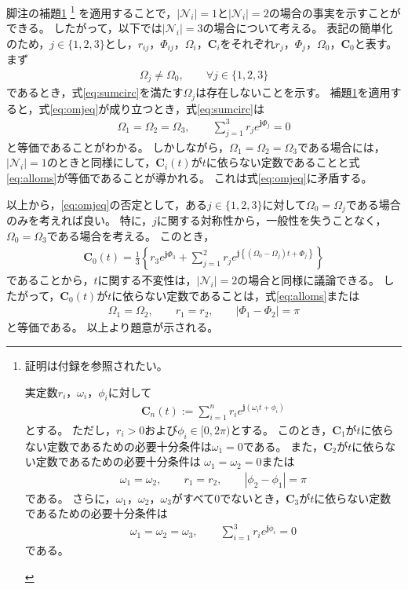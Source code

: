 \documentclass[tombow,dvipdfmx]{corona-a5-1.1}
\begin{document}
\begin{証明}
脚注の補題\ref{lem:sumc}
\footnote{
証明は付録を参照されたい。
\begin{補題*}\label{lem:sumc}
実定数$r_i$，$\omega_i$，$\phi_i$に対して
\begin{align*}
\bm{C}_n(t) := 
\sum_{i=1}^n r_i e^{ \bm{j} (\omega_i t + \phi_i)}
\end{align*}
とする。
ただし，$r_i>0$および$\phi_i \in [0,2\pi)$とする。
このとき，$\bm{C}_1$が$t$に依らない定数であるための必要十分条件は$\omega_1=0$である。
また，$\bm{C}_2$が$t$に依らない定数であるための必要十分条件は
$\omega_1=\omega_2=0$または
\begin{align*}
\omega_1=\omega_2
,\qquad
r_1=r_2
,\qquad
|\phi_2-\phi_1| = \pi
\end{align*}
である。
さらに，$\omega_1$，$\omega_2$，$\omega_3$がすべて0でないとき，$\bm{C}_3$が$t$に依らない定数であるための必要十分条件は
\begin{align*}
\omega_1=\omega_2=\omega_3
,\qquad
\sum_{i=1}^3 r_i e^{\bm{j}\phi_i}=0
\end{align*}
である。
\end{補題*}
}
を適用することで，$|\mathcal{N}_i|=1$と$|\mathcal{N}_i|=2$の場合の事実を示すことができる。
したがって，以下では$|\mathcal{N}_i|=3$の場合について考える。
表記の簡単化のため，$j \in\{1,2,3\}$とし，$r_{ij}$，$\Phi_{ij}$，$\Omega_i$，$\bm{C}_i$をそれぞれ$r_{j}$，$\Phi_{j}$，$\Omega_0$，$\bm{C}_0$と表す。
まず
\begin{align}\label{eq:omjeq}
\Omega_j \neq \Omega_0
,\qquad \forall j \in \{1,2,3\}
\end{align}
であるとき，式\ref{eq:sumcirc}を満たす$\Omega_j$は存在しないことを示す。
補題\ref{lem:sumc}を適用すると，式\ref{eq:omjeq}が成り立つとき，式\ref{eq:sumcirc}は
\begin{align*}
\Omega_1 = \Omega_2 = \Omega_3,\qquad
\sum_{j=1}^3 
r_j e^{\bm{j} \Phi_j}=0
\end{align*}
と等価であることがわかる。
しかしながら，$\Omega_1 = \Omega_2 = \Omega_3$である場合には，$|\mathcal{N}_i|=1$のときと同様にして，$\bm{C}_i (t)$が$t$に依らない定数であることと式\ref{eq:alloms}が等価であることが導かれる。
これは式\ref{eq:omjeq}に矛盾する。

以上から，\ref{eq:omjeq}の否定として，ある$j\in\{1,2,3\}$に対して$\Omega_0=\Omega_j$である場合のみを考えれば良い。
特に，$j$に関する対称性から，一般性を失うことなく，$\Omega_0=\Omega_3$である場合を考える。
このとき，
\begin{align*}
\bm{C}_0 (t) = \frac{1}{3} \left\{
r_3 e^{\bm{j} \Phi_3}
+
\sum_{j=1}^2
r_{j}
e^{\bm{j} 
\left\{
(\Omega_0 - \Omega_j)t + 
\Phi_{j}
\right\} }
\right\}
\end{align*}
であることから，$t$に関する不変性は，$|\mathcal{N}_i|=2$の場合と同様に議論できる。
したがって，$\bm{C}_0 (t)$が$t$に依らない定数であることは，式\ref{eq:alloms}または
\begin{align*}
\Omega_{1} = \Omega_{2}
,\qquad
r_{1} = r_{2}
,\qquad
|\Phi_{1}-\Phi_{2}| = \pi
\end{align*}
と等価である。
以上より題意が示される。
\end{証明}
\end{document}
